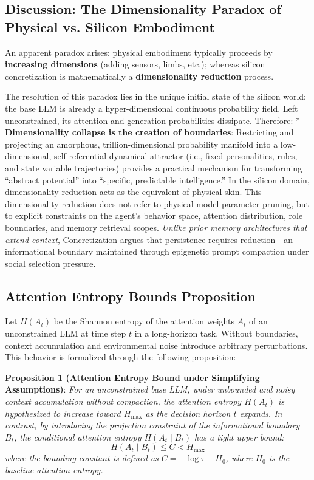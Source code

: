 \documentclass[10pt,journal,compsoc]{IEEEtran}
\begin{document}
\subsection{Discussion: The Dimensionality Paradox of Physical vs. Silicon Embodiment}
An apparent paradox arises: physical embodiment typically proceeds by \textbf{increasing dimensions} (adding sensors, limbs, etc.); whereas silicon concretization is mathematically a \textbf{dimensionality reduction} process.

The resolution of this paradox lies in the unique initial state of the silicon world: the base LLM is already a hyper-dimensional continuous probability field. Left unconstrained, its attention and generation probabilities dissipate. Therefore:
* \textbf{Dimensionality collapse is the creation of boundaries}: Restricting and projecting an amorphous, trillion-dimensional probability manifold into a low-dimensional, self-referential dynamical attractor (i.e., fixed personalities, rules, and state variable trajectories) provides a practical mechanism for transforming ``abstract potential'' into ``specific, predictable intelligence.'' In the silicon domain, dimensionality reduction acts as the equivalent of physical skin. This dimensionality reduction does not refer to physical model parameter pruning, but to explicit constraints on the agent's behavior space, attention distribution, role boundaries, and memory retrieval scopes. \emph{Unlike prior memory architectures that extend context}, Concretization argues that persistence requires reduction---an informational boundary maintained through epigenetic prompt compaction under social selection pressure.

\subsection{Attention Entropy Bounds Proposition}
Let $H(A_t)$ be the Shannon entropy of the attention weights $A_t$ of an unconstrained LLM at time step $t$ in a long-horizon task. Without boundaries, context accumulation and environmental noise introduce arbitrary perturbations.
This behavior is formalized through the following proposition:

\textbf{Proposition 1 (Attention Entropy Bound under Simplifying Assumptions)}: \textit{For an unconstrained base LLM, under unbounded and noisy context accumulation without compaction, the attention entropy $H(A_t)$ is hypothesized to increase toward $H_{\max}$ as the decision horizon $t$ expands. In contrast, by introducing the projection constraint of the informational boundary $B_t$, the conditional attention entropy $H(A_t \mid B_t)$ has a tight upper bound:}
\begin{equation}
H(A_t \mid B_t) \le C < H_{\max}
\end{equation}
\textit{where the bounding constant is defined as $C = -\log \tau + H_0$, where $H_0$ is the baseline attention entropy.}
\end{document}
